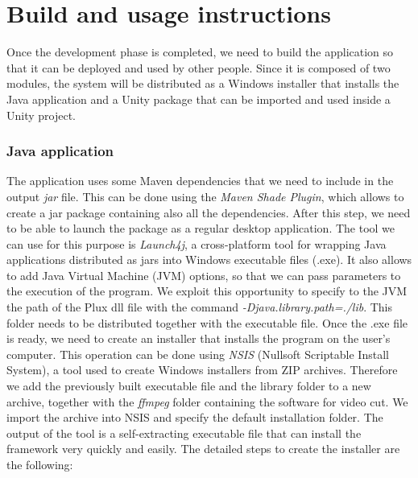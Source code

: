 \documentclass[binding=0.6cm,LaM]{sapthesis}
\begin{document}
\section{Build and usage instructions}
\label{sec:build}
Once the development phase is completed, we need to build the application so that it can be deployed and used by other people. Since it is composed of two modules, the system will be distributed as a Windows installer that installs the Java application and a Unity package that can be imported and used inside a Unity project.

\subsubsection{Java application}
The application uses some Maven dependencies that we need to include in the output \textit{jar} file. This can be done using the \textit{Maven Shade Plugin}, which allows to create a jar package containing also all the dependencies. 
After this step, we need to be able to launch the package as a regular desktop application. The tool we can use for this purpose is \textit{Launch4j}, a cross-platform tool for wrapping Java applications distributed as jars into Windows executable files (.exe). It also allows to add Java Virtual Machine (JVM) options, so that we can pass parameters to the execution of the program. We exploit this opportunity to specify to the JVM the path of the Plux dll file with the command \textit{-Djava.library.path=./lib}. This folder needs to be distributed together with the executable file. Once the .exe file is ready, we need to create an installer that installs the program on the user's computer. This operation can be done using \textit{NSIS} (Nullsoft Scriptable Install System), a tool used to create Windows installers from ZIP archives. Therefore we add the previously built executable file and the library folder to a new archive, together with the \textit{ffmpeg} folder containing the software for video cut. We import the archive into NSIS and specify the default installation folder. The output of the tool is a self-extracting executable file that can install the framework very quickly and easily.
The detailed steps to create the installer are the following:
\end{document}
